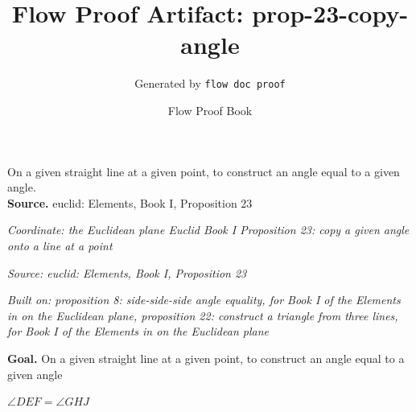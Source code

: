 \documentclass[11pt]{article}
\title{Flow Proof Artifact: prop-23-copy-angle}
\author{Generated by \texttt{flow doc proof}}
\date{Flow Proof Book}
\theoremstyle{definition}
\begin{document}
\maketitle
On a given straight line at a given point, to construct an angle equal to a given angle.\\[0.5em]
\textbf{Source.} euclid: Elements, Book I, Proposition 23\\[0.5em]
\bigskip
{}\par
\smallskip\noindent\textit{Coordinate: the Euclidean plane \cdot Euclid Book I \cdot Proposition 23: copy a given angle onto a line at a point}\par
\smallskip\noindent\textit{Source: euclid: Elements, Book I, Proposition 23}\par
\smallskip\noindent\textit{Built on: proposition 8: side-side-side angle equality, for Book I of the Elements in on the Euclidean plane, proposition 22: construct a triangle from three lines, for Book I of the Elements in on the Euclidean plane}\par
\medskip
\noindent\textbf{Goal.} On a given straight line at a given point, to construct an angle equal to a given angle\par
\noindent$\displaystyle \angle DEF = \angle GHJ$\par
\medskip
\noindent
\end{document}
